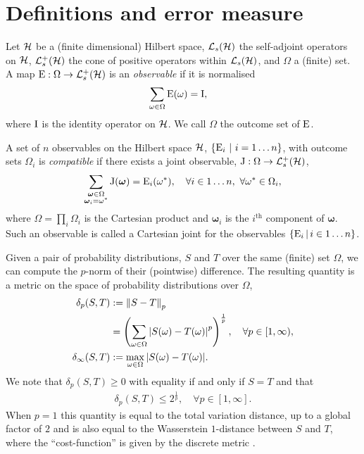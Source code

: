 \section{Definitions and error measure}
\label{sec:error-measure}
Let $\mathcal{H}$ be a (finite dimensional) Hilbert space, $\saops[\hcal]$ the self-adjoint operators on $\mathcal{H}$, $\posops[\hcal]$ the cone of positive operators within $\saops[\hcal]$, and $\Omega$ a (finite) set.  A map $\ope:\Omega\to \posops[\hcal]$ is an \emph{observable} if it is normalised
\begin{align}
  \sum_{\omega\in\Omega} \operatorname{E}(\omega) &= \operatorname{I},
\end{align}
where $\operatorname{I}$ is the identity operator on $\mathcal{H}$. We call $\Omega$ the outcome set of $\operatorname{E}$.

A set of $n$ observables on the Hilbert space $\mathcal{H}$, $\left\{\operatorname{E}_i\,\,\middle|\,\,i=1\hdots n\right\}$, with outcome sets $\Omega_i$ is \emph{compatible} if there exists a joint observable, $\opj: \Omega \to \posops[\hcal]$,
\begin{align}
  \label{eqn:cart-joint}
  \sum_{\substack{\bm{\omega}\in\Omega\\\bm{\omega}_i = \omega^*}}\operatorname{J}(\bm{\omega}) = \operatorname{E}_i(\omega^*), \quad \forall i\in 1\hdots n,\ \forall \omega^*\in\Omega_i,
\end{align}
where $\Omega = \prod_i \Omega_i$ is the Cartesian product and $\bm{\omega}_i$ is the $i^\text{th}$ component of $\bm{\omega}$. Such an observable is called a Cartesian joint for the observables $\left\{\operatorname{E}_i\,\middle|\,i\in 1\hdots n\right\}$.

Given a pair of probability distributions, $S$ and $T$  over the same (finite) set $\Omega$, we can compute the $p$-norm of their (pointwise) difference. The resulting quantity is a metric on the space of probability distributions over $\Omega$,
\begin{align}
  \delta_p(S,T) &\defeq \pnorm{S - T}\\
                 &= \left(\sum_{\omega\in\Omega}\abs{S(\omega) - T(\omega)}^p\right)^{\frac{1}{p}}, \quad \forall p\in[1,\infty),\\
  \delta_\infty(S,T) &\defeq \max_{\omega\in\Omega}\abs{S(\omega) - T(\omega)}.
\end{align}
We note that $\delta_p(S,T) \geq 0$ with equality if and only if $S = T$ and that
\begin{align}
  \delta_p(S,T) \leq 2^{\frac{1}{p}}, \quad \forall p\in [1,\infty].
\end{align}
When $p=1$ this quantity is equal to the total variation distance, up to a global factor of $2$ and is also equal to the Wasserstein $1$-distance between $S$ and $T$, where the ``cost-function'' is given by the discrete metric \cites{markov-mixing-levin-peres-wilmer}{optimal-transport-villani}.

